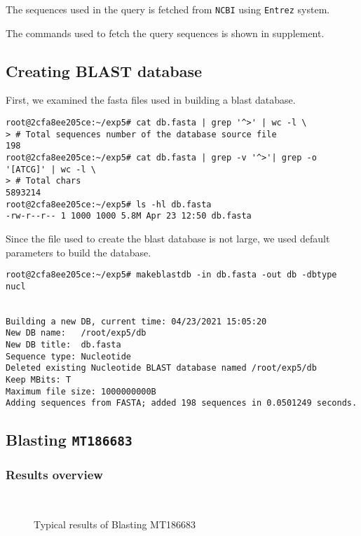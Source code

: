 \documentclass[en,black,10pt,normal]{elegantnote}
\newcommand{\upcite}[1]{\textsuperscript{\textsuperscript{\cite{#1}}}}
\begin{document}
The sequences used in the query is fetched from \texttt{NCBI} using \lstinline{Entrez} system.

The commands used to fetch the query sequences is shown in supplement.

\subsection{Creating BLAST database}

First, we examined the fasta files used in building a blast database.

\begin{lstlisting}
root@2cfa8ee205ce:~/exp5# cat db.fasta | grep '^>' | wc -l \                                             
> # Total sequences number of the database source file
198
root@2cfa8ee205ce:~/exp5# cat db.fasta | grep -v '^>'| grep -o '[ATCG]' | wc -l \ 
> # Total chars
5893214
root@2cfa8ee205ce:~/exp5# ls -hl db.fasta 
-rw-r--r-- 1 1000 1000 5.8M Apr 23 12:50 db.fasta
\end{lstlisting}

Since the file used to create the blast database is not large,
we used default parameters to build the database.
\begin{lstlisting}
root@2cfa8ee205ce:~/exp5# makeblastdb -in db.fasta -out db -dbtype nucl


Building a new DB, current time: 04/23/2021 15:05:20
New DB name:   /root/exp5/db
New DB title:  db.fasta
Sequence type: Nucleotide
Deleted existing Nucleotide BLAST database named /root/exp5/db
Keep MBits: T
Maximum file size: 1000000000B
Adding sequences from FASTA; added 198 sequences in 0.0501249 seconds.
\end{lstlisting}



\subsection{Blasting \texttt{MT186683}}

\subsubsection{Results overview}

\begin{figure}[H]
  \centering
  \subfigure[MN908947]{\texttt{[image: B1]}}
  \subfigure[MG772934]{\texttt{[image: B3]}}\\
  \subfigure[DQ412042]{\texttt{[image: B4]}}
  \caption{Typical results of Blasting MT186683\upcite{wintersinger2015kablammo}}
  \label{fig1} %
\end{figure}
\end{document}
